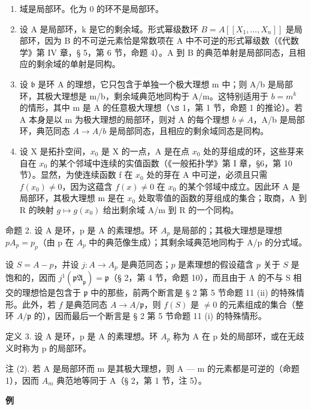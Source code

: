 \begin{enumerate}
\def\labelenumi{(\arabic{enumi})}
\item
  域是局部环。化为 0 的环不是局部环。
\item
  设 A 是局部环，k 是它的剩余域。形式幂级数环 \(B = A[[X_{1}, \ldots, X_{n}]]\) 是局部环，因为 B 的不可逆元素恰是常数项在 A 中不可逆的形式幂级数（《代数学》第 IV 章，§ 5，第 6 节，命题 4）。A 到 B 的典范单射是局部同态，且相应的剩余域的单射是同构。
\item
  设 \(\mathfrak{b}\) 是环 A 的理想，它只包含于单独一个极大理想 m 中；则 A/b 是局部环，其极大理想是 m/b，剩余域典范地同构于 A/m。这特别适用于 \(b = m^{k}\) 的情形，其中 m 是 A 的任意极大理想（\(\S\) 1，第 1 节，命题 1 的推论）。若 A 本身是以 m 为极大理想的局部环，则对 A 的每个理想 \(b \neq A\)，A/b 是局部环，典范同态 \(A \to A/b\) 是局部同态，且相应的剩余域同态是同构。
\item
  设 X 是拓扑空间，\(x_{0}\) 是 X 的一点，A 是在点 \(x_{0}\) 处的芽组成的环，这些芽来自在 \(x_{0}\) 的某个邻域中连续的实值函数（《一般拓扑学》第 I 章，§6，第 10 节）。显然，为使连续函数 f 在 \(x_{0}\) 处的芽在 A 中可逆，必须且只需 \(f(x_{0}) \neq 0\)，因为这蕴含 \(f(x) \neq 0\) 在 \(x_{0}\) 的某个邻域中成立。因此环 A 是局部环，其极大理想 m 是在 \(x_{0}\) 处取零值的函数的芽组成的集合；取商，A 到 R 的映射 \(g \mapsto g(x_{0})\) 给出剩余域 A/m 到 R 的一个同构。
\end{enumerate}

命题 2. 设 A 是环，p 是 A 的素理想。环 \(A_{p}\) 是局部的；其极大理想是理想 \(pA_{p} = p_{p}\)（由 p 在 \(A_{p}\) 中的典范像生成）；其剩余域典范地同构于 A/p 的分式域。

设 \(S = A - p\)，并设 \(j: A \to A_p\) 是典范同态；\(p\) 是素理想的假设蕴含 \(p\) 关于 \(S\) 是饱和的，因而 \(j^{1}(\mathfrak{pA}_{\mathfrak{p}}) = \mathfrak{p}\)（§ 2，第 4 节，命题 10），而且由于 A 的不与 S 相交的理想恰是包含于 \(\mathfrak{p}\) 中的那些，前两个断言是 § 2 第 5 节命题 11 (ii) 的特殊情形。此外，若 \(f\) 是典范同态 \(A \to A/\mathfrak{p}\)，则 \(f(S)\) 是 \(\neq 0\) 的元素组成的集合（整环 \(A/\mathfrak{p}\) 的），因而最后一个断言是 § 2 第 5 节命题 11 (i) 的特殊情形。

定义 3. 设 A 是环，p 是 A 的素理想。环 \(A_{p}\) 称为 A 在 p 处的局部环，或在无歧义时称为 p 的局部环。

注 (2). 若 A 是局部环而 m 是其极大理想，则 A --- m 的元素都是可逆的（命题 1），因而 \(A_{m}\) 典范地等同于 A（§ 2，第 1 节，注 5）。

\textbf{例}\par

